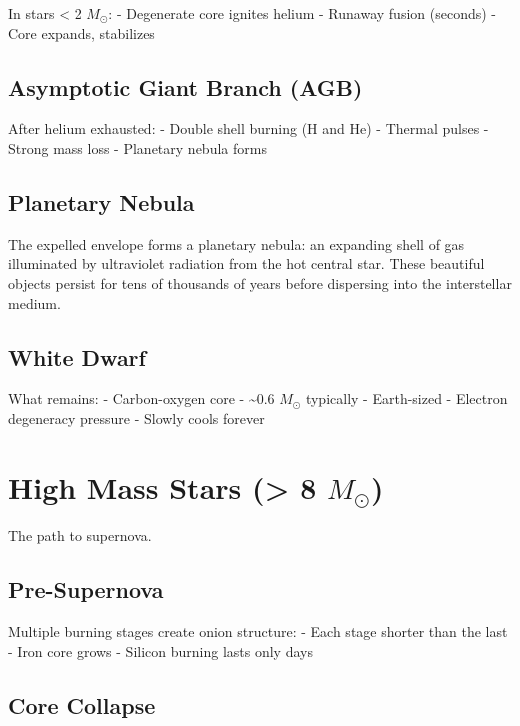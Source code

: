 \documentclass[
  11pt,
  letterpaper,
  twoside,
  openright]{book}
\begin{document}
In stars \textless{} 2 \(M_\odot\): - Degenerate core ignites helium -
Runaway fusion (seconds) - Core expands, stabilizes

\subsection{Asymptotic Giant Branch
(AGB)}\label{asymptotic-giant-branch-agb}

After helium exhausted: - Double shell burning (H and He) - Thermal
pulses - Strong mass loss - Planetary nebula forms

\subsection{Planetary Nebula}\label{planetary-nebula}

The expelled envelope forms a planetary nebula: an expanding shell of
gas illuminated by ultraviolet radiation from the hot central star.
These beautiful objects persist for tens of thousands of years before
dispersing into the interstellar medium.

\subsection{White Dwarf}\label{white-dwarf}

What remains: - Carbon-oxygen core - \textasciitilde0.6 \(M_\odot\)
typically - Earth-sized - Electron degeneracy pressure - Slowly cools
forever

\section{\texorpdfstring{High Mass Stars (\textgreater{} 8
\(M_\odot\))}{High Mass Stars (\textgreater{} 8 M\_\textbackslash odot)}}\label{high-mass-stars-8-m_odot}

The path to supernova.

\subsection{Pre-Supernova}\label{pre-supernova}

Multiple burning stages create onion structure: - Each stage shorter
than the last - Iron core grows - Silicon burning lasts only days

\subsection{Core Collapse}\label{core-collapse}
\end{document}
